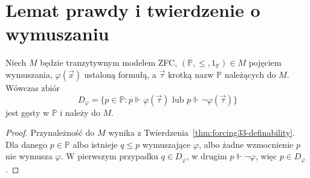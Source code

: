 \section{Lemat prawdy i twierdzenie o wymuszaniu}

\begin{lemat}
\label{lem:forcing33-decision}
Niech $M$ będzie tranzytywnym modelem ZFC,
$(\mathbb P,\leq,1_{\mathbb P})\in M$
pojęciem wymuszania,
$\varphi(\vec x)$ ustaloną formułą,
a $\vec\tau$ krotką nazw $\mathbb P$
należących do $M$. Wówczas zbiór
\[
D_\varphi=\{p\in\mathbb P:
p\Vdash\varphi(\vec\tau)
\text{ lub }p\Vdash\neg\varphi(\vec\tau)\}
\]
jest gęsty w $\mathbb P$ i należy do $M$.
\end{lemat}
\begin{proof}
Przynależność do $M$ wynika z
Twierdzenia~\ref{thm:forcing33-definability}.
Dla danego $p\in\mathbb P$ albo
istnieje $q\leq p$ wymuszające
$\varphi$, albo żadne wzmocnienie
$p$ nie wymusza $\varphi$.
W pierwszym przypadku $q\in D_\varphi$,
w drugim $p\Vdash\neg\varphi$,
więc $p\in D_\varphi$.
\end{proof}

